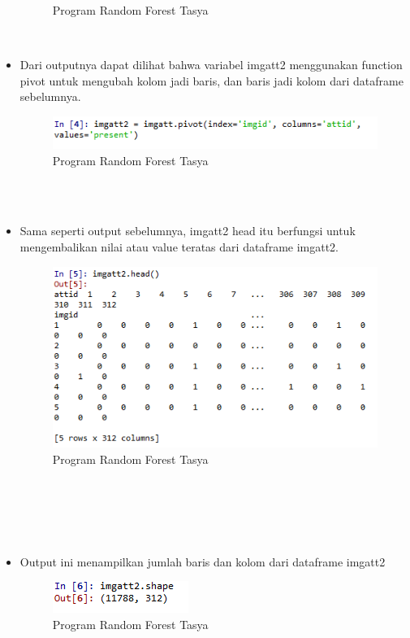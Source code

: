 \begin{itemize}
\begin{figure}[ht]
\caption{Program Random Forest Tasya}
\label{Praktek}
\end{figure}
\\
\item Dari outputnya dapat dilihat bahwa variabel imgatt2 menggunakan function pivot untuk mengubah kolom jadi baris, dan baris jadi kolom dari dataframe sebelumnya.
\begin{figure}[ht]
\centering
\includegraphics[scale=0.5]{figures/rf4.png}
\caption{Program Random Forest Tasya}
\label{Praktek}
\end{figure}
\\
\\
\item Sama seperti output sebelumnya, imgatt2 head itu berfungsi untuk mengembalikan nilai atau value teratas dari dataframe imgatt2.
\begin{figure}[ht]
\centering
\includegraphics[scale=0.5]{figures/rf5.png}
\caption{Program Random Forest Tasya}
\label{Praktek}
\end{figure}
\\
\\
\\
\\
\item Output ini menampilkan jumlah baris dan kolom dari dataframe imgatt2
\begin{figure}[ht]
\centering
\includegraphics[scale=0.5]{figures/rf6.png}
\caption{Program Random Forest Tasya}
\label{Praktek}
\end{figure}

\end{itemize}

